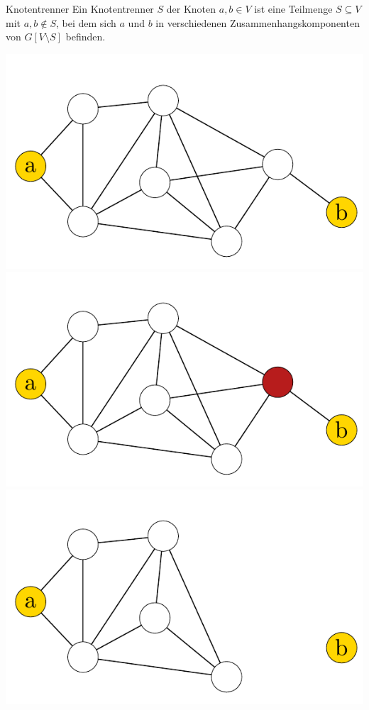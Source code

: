 \documentclass[xcolor=x11names,compress]{beamer}
\begin{document}
\begin{frame}
	\begin{block}{Knotentrenner}
		Ein Knotentrenner \( S \) der Knoten \( a, b \in V \) ist eine Teilmenge \( S \subseteq V \) mit \( a, b \not\in S \), bei dem sich \( a \) und \( b \) in verschiedenen Zusammenhangskomponenten von \( G \left[ V \setminus S \right] \) befinden.
	\end{block}
	\begin{center}
		\begin{overprint}
			\includegraphics[scale=1.0]{img/graph/nodeseparator/01.pdf}
			\onslide<2>\includegraphics[scale=1.0]{img/graph/nodeseparator/02.pdf}
			\onslide<3>\includegraphics[scale=1.0]{img/graph/nodeseparator/03.pdf}

\end{overprint}
\end{center}
\end{frame}
\end{document}

